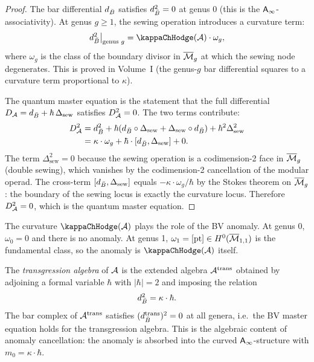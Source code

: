 \begin{proof}
The bar differential $d_{\bar{B}}$ satisfies $d_{\bar{B}}^2 = 0$ at genus 0
(this is the $\mathsf{A}_{\infty}$-associativity). At genus $g \geq 1$, the sewing
operation introduces a curvature term:
\[
d_{\barB}^2\big|_{\text{genus } g}
 = \kappaChHodge(\cA) \cdot \omega_g,
\]
where $\omega_g$ is the class of the boundary divisor in $\overline{\mathcal{M}}_g$
at which the sewing node degenerates. This is proved in Volume~I
(the genus-$g$ bar differential squares to a curvature term
proportional to $\kappa$).

The quantum master equation is the statement that the full differential
$D_{\mathcal{A}} = d_{\bar{B}} + \hbar \, \Delta_{\mathrm{sew}}$ satisfies
$D_{\mathcal{A}}^2 = 0$. The two terms contribute:
\begin{align*}
D_{\mathcal{A}}^2
 &= d_{\bar{B}}^2 + \hbar(d_{\bar{B}} \circ \Delta_{\mathrm{sew}}
 + \Delta_{\mathrm{sew}} \circ d_{\bar{B}})
 + \hbar^2 \Delta_{\mathrm{sew}}^2 \\
 &= \kappa \cdot \omega_g
 + \hbar \cdot [d_{\bar{B}}, \Delta_{\mathrm{sew}}]
 + 0.
\end{align*}
The term $\Delta_{\mathrm{sew}}^2 = 0$ because the sewing operation is
a codimension-2 face in $\overline{\mathcal{M}}_g$ (double sewing), which vanishes by
the codimension-2 cancellation of the modular operad. The cross-term
$[d_{\bar{B}}, \Delta_{\mathrm{sew}}]$ equals $-\kappa \cdot \omega_g / \hbar$
by the Stokes theorem on $\overline{\mathcal{M}}_g$: the boundary of the sewing
locus is exactly the curvature locus. Therefore $D_{\mathcal{A}}^2 = 0$, which
is the quantum master equation.
\end{proof}

\begin{remark}
The curvature $\kappaChHodge(\cA)$ plays the role of the BV anomaly. At
genus 0, $\omega_0 = 0$ and there is no anomaly. At genus 1,
$\omega_1 = [\mathrm{pt}] \in H^0(\overline{\mathcal{M}}_{1,1})$ is the fundamental
class, so the anomaly is $\kappaChHodge(\cA)$ itself.

The \emph{transgression algebra} of $\mathcal{A}$ is the extended algebra
$\mathcal{A}^{\mathrm{trans}}$ obtained by adjoining a formal variable $\hbar$
with $|\hbar| = 2$ and imposing the relation
\[
d_{\bar{B}}^2 = \kappa \cdot \hbar.
\]
The bar complex of $\mathcal{A}^{\mathrm{trans}}$ satisfies
$(d_{\bar{B}}^{\mathrm{trans}})^2 = 0$ at all genera, i.e.\ the BV master
equation holds for the transgression algebra. This is the algebraic
content of anomaly cancellation: the anomaly is absorbed into the
curved $\mathsf{A}_{\infty}$-structure with $m_0 = \kappa \cdot \hbar$.
\end{remark}


